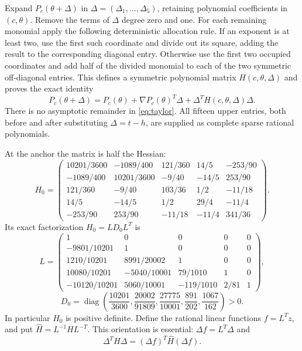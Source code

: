 \documentclass[11pt]{article}
\theoremstyle{definition}
\begin{document}
Expand $P_c(\theta+\Delta)$ in $\Delta=(\Delta_1,\ldots,\Delta_5)$, retaining
polynomial coefficients in $(c,\theta)$. Remove the terms of $\Delta$ degree
zero and one. For each remaining monomial apply the following deterministic
allocation rule. If an exponent is at least two, use the first such coordinate
and divide out its square, adding the result to the corresponding diagonal
entry. Otherwise use the first two occupied coordinates and add half of the
divided monomial to each of the two symmetric off-diagonal entries. This
defines a symmetric polynomial matrix $H(c,\theta,\Delta)$ and proves the
exact identity
\begin{equation}
 P_c(\theta+\Delta)=P_c(\theta)+\nabla P_c(\theta)^T\Delta
                 +\Delta^TH(c,\theta,\Delta)\Delta.
 \label{eq:taylor}
\end{equation}
There is no asymptotic remainder in \eqref{eq:taylor}. All fifteen upper
entries, both before and after substituting $\Delta=t-h$, are supplied as
complete sparse rational polynomials.

At the anchor the matrix is half the Hessian:
\begin{equation}
 H_0=
 \begin{pmatrix}
 10201/3600&-1089/400&121/360&14/5&-253/90\\
 -1089/400&10201/3600&-9/40&-14/5&253/90\\
 121/360&-9/40&103/36&1/2&-11/18\\
 14/5&-14/5&1/2&29/4&-11/4\\
 -253/90&253/90&-11/18&-11/4&341/36
 \end{pmatrix}.
 \label{eq:hessian}
\end{equation}
Its exact factorization $H_0=LD_0L^T$ is
\begin{equation}
 L=\begin{pmatrix}
 1&0&0&0&0\\
 -9801/10201&1&0&0&0\\
 1210/10201&8991/20002&1&0&0\\
 10080/10201&-5040/10001&79/1010&1&0\\
 -10120/10201&5060/10001&-119/1010&2/81&1
 \end{pmatrix},
 \label{eq:L}
\end{equation}
\begin{equation}
 D_0=\operatorname{diag}\left(
 \frac{10201}{3600},\frac{20002}{91809},\frac{27775}{10001},
 \frac{891}{202},\frac{1067}{162}\right)>0.
 \label{eq:pivots}
\end{equation}
In particular $H_0$ is positive definite. Define the rational linear functions
$f=L^Tz$, and put $\widehat H=L^{-1}HL^{-T}$. This orientation is essential:
$\Delta f=L^T\Delta$ and
\begin{equation}
 \Delta^TH\Delta=(\Delta f)^T\widehat H(\Delta f).
 \label{eq:orientation}
\end{equation}
\end{document}
